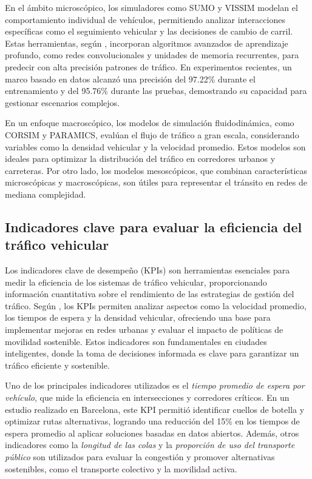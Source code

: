 En el ámbito microscópico, los simuladores como SUMO y VISSIM modelan el comportamiento individual de vehículos, permitiendo analizar interacciones específicas como el seguimiento vehicular y las decisiones de cambio de carril. Estas herramientas, según \cite{Hao2024}, incorporan algoritmos avanzados de aprendizaje profundo, como redes convolucionales y unidades de memoria recurrentes, para predecir con alta precisión patrones de tráfico. En experimentos recientes, un marco basado en datos alcanzó una precisión del 97.22\% durante el entrenamiento y del 95.76\% durante las pruebas, demostrando su capacidad para gestionar escenarios complejos.

En un enfoque macroscópico, los modelos de simulación fluidodinámica, como CORSIM y PARAMICS, evalúan el flujo de tráfico a gran escala, considerando variables como la densidad vehicular y la velocidad promedio. Estos modelos son ideales para optimizar la distribución del tráfico en corredores urbanos y carreteras. Por otro lado, los modelos mesoscópicos, que combinan características microscópicas y macroscópicas, son útiles para representar el tránsito en redes de mediana complejidad.


\subsection{Indicadores clave para evaluar la eficiencia del tráfico vehicular}  
Los indicadores clave de desempeño (KPIs) son herramientas esenciales para medir la eficiencia de los sistemas de tráfico vehicular, proporcionando información cuantitativa sobre el rendimiento de las estrategias de gestión del tráfico. Según \cite{Ahsini2023}, los KPIs permiten analizar aspectos como la velocidad promedio, los tiempos de espera y la densidad vehicular, ofreciendo una base para implementar mejoras en redes urbanas y evaluar el impacto de políticas de movilidad sostenible. Estos indicadores son fundamentales en ciudades inteligentes, donde la toma de decisiones informada es clave para garantizar un tráfico eficiente y sostenible.

Uno de los principales indicadores utilizados es el \textit{tiempo promedio de espera por vehículo}, que mide la eficiencia en intersecciones y corredores críticos. En un estudio realizado en Barcelona, este KPI permitió identificar cuellos de botella y optimizar rutas alternativas, logrando una reducción del 15\% en los tiempos de espera promedio al aplicar soluciones basadas en datos abiertos. Además, otros indicadores como la \textit{longitud de las colas} y la \textit{proporción de uso del transporte público} son utilizados para evaluar la congestión y promover alternativas sostenibles, como el transporte colectivo y la movilidad activa.

